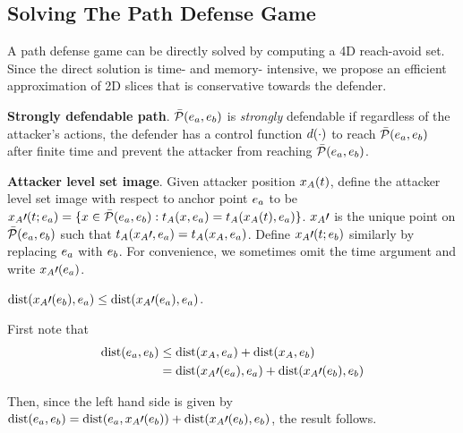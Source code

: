 \subsection{Solving The Path Defense Game}
A path defense game can be directly solved by computing a 4D reach-avoid set. Since the direct solution is time- and memory- intensive, we propose an efficient approximation of 2D slices that is conservative towards the defender.


\begin{defn} %
\textbf{Strongly defendable path}. $\bar{\mathcal{P}}(e_a,e_b)$ is \textit{strongly} defendable if regardless of the attacker's actions, the defender has a control function $d(\cdot)$ to reach $\bar{\mathcal{P}}(e_a,e_b)$ after finite time and prevent the attacker from reaching $\bar{\mathcal{P}}(e_a,e_b)$.
\end{defn}


\begin{defn} %
\textbf{Attacker level set image}. Given attacker position $x_A(t)$, define the attacker level set image with respect to anchor point $e_a$ to be $x_A\prime(t;e_a) = \{x\in\bar{\mathcal{P}}(e_a,e_b): t_A(x,e_a) = t_A(x_A(t),e_a)\}$. $x_A\prime$ is the unique point on $\bar{\mathcal{P}}(e_a,e_b)$ such that $t_A(x_A\prime, e_a)=t_A(x_A,e_a)$. Define $x_A\prime(t;e_b)$ similarly by replacing $e_a$ with $e_b$. For convenience, we sometimes omit the time argument and write $x_A\prime(e_a)$.
\end{defn}

\begin{prop}
\label{rem:image_of_a}
$\text{dist}(x_A\prime(e_b),e_a) \le \text{dist}(x_A\prime(e_a),e_a)$. 
\end{prop}

\begin{IEEEproof}
First note that
\begin{equation*}
\begin{aligned}
\text{dist}(e_a,e_b) &\le \text{dist}(x_A,e_a) + \text{dist}(x_A,e_b)\\
& = \text{dist}(x_A\prime(e_a),e_a) + \text{dist}(x_A\prime(e_b),e_b)
\end{aligned}
\end{equation*}

Then, since the left hand side is given by $\text{dist}(e_a,e_b) = \text{dist}(e_a,x_A\prime(e_b))+\text{dist}(x_A\prime(e_b),e_b)$, the result follows.
\end{IEEEproof}


